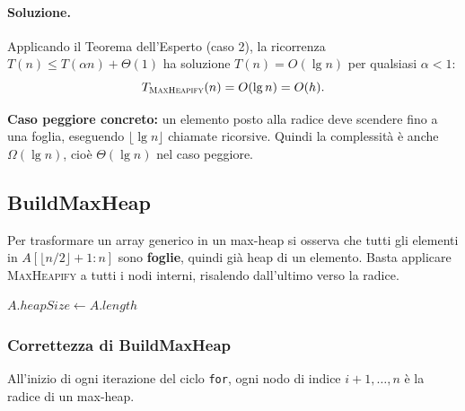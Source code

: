 \paragraph{Soluzione.}
Applicando il Teorema dell'Esperto (caso 2), la ricorrenza
$T(n) \le T\!\left(\alpha n\right) + \Theta(1)$ ha soluzione
$T(n) = O(\lg n)$ per qualsiasi $\alpha < 1$:
\[
T_{\textsc{MaxHeapify}}(n) = O(\lg n) = O(h).
\]

\begin{hardnote}
	\textbf{Caso peggiore concreto:} un elemento posto alla radice deve
	scendere fino a una foglia, eseguendo $\lfloor \lg n \rfloor$ chiamate
	ricorsive. Quindi la complessità è anche $\Omega(\lg n)$, cioè
	$\Theta(\lg n)$ nel caso peggiore.
\end{hardnote}

\subsection{BuildMaxHeap}

\begin{softnote}
	Per trasformare un array generico in un max-heap si osserva che
	tutti gli elementi in $A[\lfloor n/2 \rfloor + 1 : n]$ sono
	\textbf{foglie}, quindi già heap di un elemento. Basta applicare
	\textsc{MaxHeapify} a tutti i nodi interni, risalendo dall'ultimo
	verso la radice.
\end{softnote}

\begin{algorithm}[H]
	\caption{\textsc{BuildMaxHeap}$(A)$}
	$A.\mathit{heapSize} \gets A.\mathit{length}$\;
\end{algorithm}

\subsubsection{Correttezza di BuildMaxHeap}

\begin{definizione}
	All'inizio di ogni iterazione del ciclo \texttt{for}, ogni nodo di
	indice $i+1, \ldots, n$ è la radice di un max-heap.
\end{definizione}

